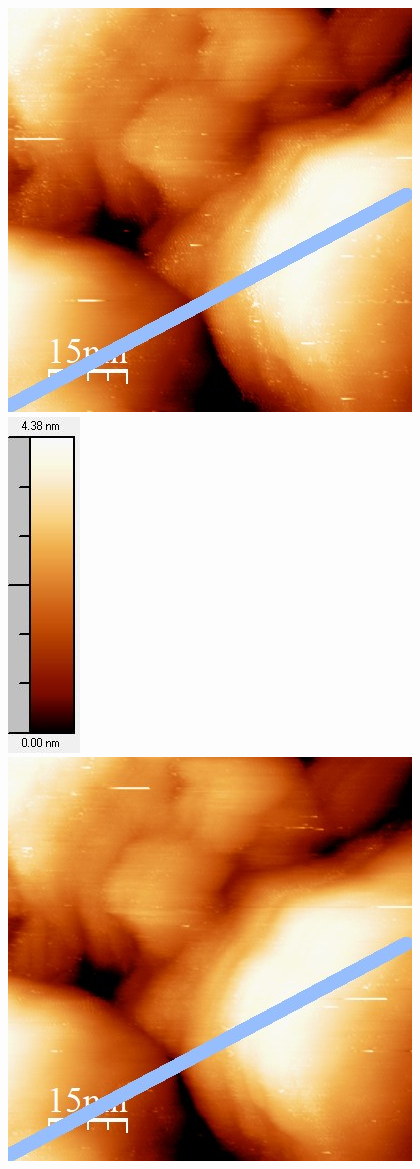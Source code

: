 \documentclass[12pt,a4paper]{article}
\begin{document}
\begin{figure}
\centering
\includegraphics[scale=0.6]{Bilder/Anhang/Zeit/0_1_Zeit_vor.jpg}
\includegraphics[scale=0.6]{Bilder/Anhang/Zeit/0_1_Zeit_vor_Skala.jpg}
\includegraphics[scale=0.6]{Bilder/Anhang/Zeit/0_1_Zeit_nach.jpg}

\end{figure}
\end{document}
